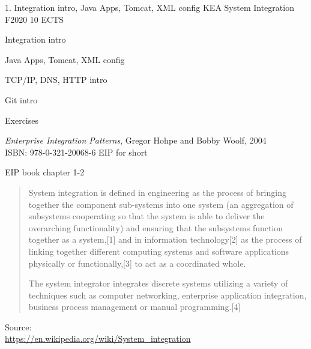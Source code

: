 \documentclass[Screen16to9,17pt]{foils}
\begin{document}
\mytitlepage
{1. Integration intro, Java Apps, Tomcat, XML config}
{KEA System Integration F2020 10 ECTS}


\begin{list2}
\item Integration intro
\item Java Apps, Tomcat, XML config

\item TCP/IP, DNS, HTTP intro

\item Git intro
\end{list2}

Exercises
\begin{list2}
\item
\item
\end{list2}





\emph{Enterprise Integration Patterns}, Gregor Hohpe and Bobby Woolf, 2004\\
ISBN: 978-0-321-20068-6 EIP for short

\begin{list1}
\item EIP book chapter 1-2
\end{list1}


\begin{quote}
  System integration is defined in engineering as the process of bringing together the component sub-systems into one system (an aggregation of subsystems cooperating so that the system is able to deliver the overarching functionality) and ensuring that the subsystems function together as a system,[1] and in information technology[2] as the process of linking together different computing systems and software applications physically or functionally,[3] to act as a coordinated whole.

  The system integrator integrates discrete systems utilizing a variety of techniques such as computer networking, enterprise application integration, business process management or manual programming.[4]
\end{quote}

Source:\\
\url{https://en.wikipedia.org/wiki/System_integration}
\end{document}
